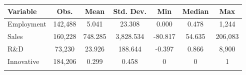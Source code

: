 \begin{center}
\begin{tabular}{lcccccc}
\hline\hline \noalign{\smallskip}Variable & Obs. & Mean & Std. Dev. & Min & Median & Max\\\hline
\noalign{\smallskip}\noalign{\smallskip}Employment & 142,488 & 5.041 & 23.308 & 0.000 & 0.478 & 1,244\\
 Sales & 160,228 & 748.285 & 3,828.534 & -80.817 & 54.635 & 206,083\\
R\&D & 73,230 & 23.926 & 188.644 & -0.397 & 0.866 & 8,900\\
Innovative & 184,206 & 0.299 & 0.458 & 0 & 0 & 1\\
\noalign{\smallskip}\hline\hline
\end{tabular}
\end{center}

